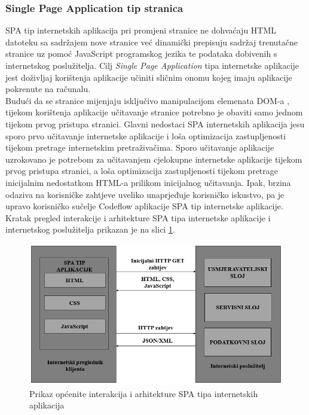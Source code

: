 \documentclass[times, utf8, zavrsni, numeric]{fer}
\begin{document}
		\subsubsection{Single Page Application tip stranica}
		SPA\cite{SPA2021}  tip internetskih aplikacija pri promjeni stranice ne dohvaćaju HTML datoteku sa sadržajem nove stranice već dinamički prepisuju sadržaj trenutačne stranice uz pomoć JavaScript programskog jezika te podataka dobivenih s internetskog poslužitelja. Cilj \textit{Single Page Application} tipa internetske aplikacije jest doživljaj korištenja aplikacije učiniti sličnim onomu kojeg imaju aplikacije pokrenute na računalu.\\ 
		Budući da se stranice mijenjaju isključivo manipulacijom elemenata DOM-a , tijekom korištenja aplikacije učitavanje stranice potrebno je obaviti samo jednom tijekom prvog pristupa stranici. Glavni nedostaci SPA internetskih aplikacija jesu sporo prvo učitavanje internetske aplikacije i loša optimizacija zastupljenosti tijekom pretrage internetskim pretraživačima. Sporo učitavanje aplikacije uzrokovano je potrebom za učitavanjem cjelokupne internetske aplikacije tijekom prvog pristupa stranici, a loša optimizacija zastupljenosti tijekom pretrage inicijalnim nedostatkom HTML-a prilikom inicijalnog učitavanja. Ipak, brzina odaziva na korisničke zahtjeve uveliko unaprjeđuje korisničko iskustvo, pa je upravo korisničko sučelje Codeflow aplikacije SPA tip internetske aplikacije. Kratak pregled interakcije i arhitekture SPA tipa internetske aplikacije i internetskog poslužitelja prikazan je na slici \ref{fig:spa}.
		\begin{figure}[H]
			\centering
			\includegraphics[width=\linewidth]{pictures/prikazi/SPA.png}
			\caption{Prikaz općenite interakcija i arhitekture SPA tipa internetskih aplikacija}
			\label{fig:spa}
		\end{figure}
				
\end{document}
